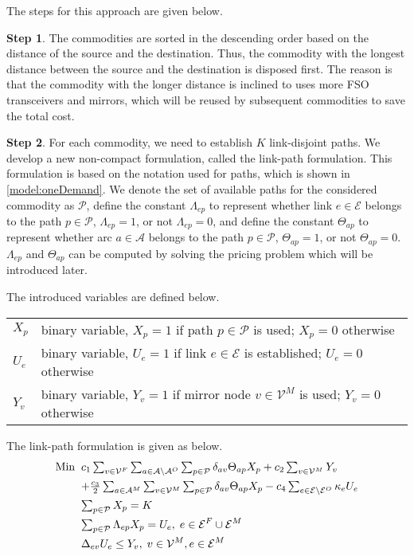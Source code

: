 \documentclass[onecolumn,11pt,draftclsnofoot]{IEEEtran}
\begin{document}
The steps for this approach are given below.

\textbf{Step 1}. The commodities are sorted in the descending order based on the distance of the source and the destination. Thus, the commodity with the longest distance between the source and the destination is disposed first. The reason is that the commodity with the longer distance is inclined to uses more FSO transceivers and mirrors, which will be reused by subsequent commodities to save the total cost.

\textbf{Step 2}. For each commodity, we need to establish $K$ link-disjoint paths. We develop a new non-compact formulation, called the link-path formulation. This formulation is based on the notation used for paths, which is shown in \eqref{model:oneDemand}. We denote the set of available paths for the considered commodity as $\mathcal P$, define the constant $\Lambda_{ep}$ to represent whether link $e \in \mathcal E$ belongs to the path $p \in \mathcal P$, $\Lambda_{ep}=1$, or not $\Lambda_{ep}=0$, and define the constant $\Theta_{ap}$ to represent whether arc $a \in \mathcal A$ belongs to the path $p \in \mathcal P$, $\Theta_{ap}=1$, or not $\Theta_{ap}=0$. $\Lambda_{ep}$ and $\Theta_{ap}$ can be computed by solving the pricing problem which will be introduced later.

The introduced variables are defined below.

\begin{tabular}{lp{16cm}}
$X_p$ &  binary variable, $X_p=1$ if path $p \in \mathcal P$ is used; $X_p=0$ otherwise\\
$U_e$ &  binary variable, $U_e=1$ if link $e \in \mathcal E$ is established; $U_e=0$ otherwise\\
$Y_v$ &  binary variable, $Y_v=1$ if mirror node $v \in \mathcal V^M$ is used; $Y_v=0$ otherwise\\
\end{tabular}

The link-path formulation is given as below.
\begin{subequations}\label{model:oneDemand}
\begin{align}
\mbox{Min} \;\; &  \mbox{$ c_1 \sum_{v \in \mathcal V^F}  \sum_{a \in  \mathcal A \setminus \mathcal A^O} \sum_{p \in \mathcal P}  \delta_{av} \Theta_{ap} X_{p}  + c_2 \sum_{v \in \mathcal V^M} Y_v $} \nonumber \\
&  \mbox{$ + \frac{c_3}{2} \sum_{a \in \mathcal A^M}\sum_{v \in \mathcal V^M} \sum_{p \in \mathcal P}  \delta_{av} \Theta_{ap}  X_p  - c_4 \sum_{e \in  \mathcal E \setminus \mathcal E^O} \kappa_{e} U_e $} \label{eq:oneDemand-1}\\
& \mbox{$\sum_{p \in \mathcal P} X_{p} =K$} \label{eq:oneDemand-2}\\
& \mbox{$\sum_{p \in \mathcal P} \Lambda_{ep} X_{p} = U_{e}$}, \; e \in \mathcal E^F \cup \mathcal E^M  \label{eq:oneDemand-3}\\
& \Delta_{ev} U_e \leq Y_v, \; v \in \mathcal V^M, e \in \mathcal E^M  \label{eq:oneDemand-5}
\end{align}
\end{subequations}
\end{document}
